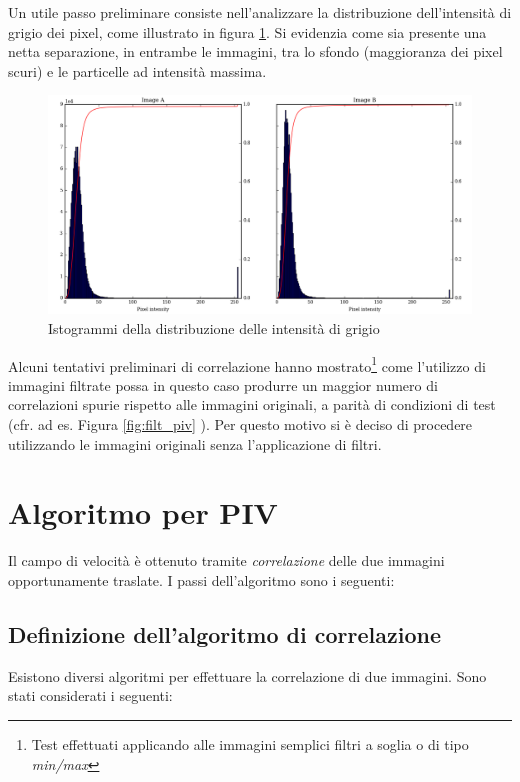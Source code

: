\documentclass[a4paper]{article}
\begin{document}
Un utile passo preliminare consiste nell'analizzare la distribuzione dell'intensità di grigio dei pixel, come illustrato in figura \ref{fig:hist}. Si evidenzia come sia presente una netta separazione, in entrambe le immagini, tra lo sfondo (maggioranza dei pixel scuri) e le particelle ad intensità massima.

\begin{figure}[h]
	\centering
	\includegraphics[width=1\textwidth]{images/hist_cr.png}
	\caption{\label{fig:hist}Istogrammi della distribuzione delle intensità di grigio}
\end{figure}

Alcuni tentativi preliminari di correlazione hanno mostrato\footnote{Test effettuati applicando alle immagini semplici filtri a soglia o di tipo \textit{min/max}\cite{mmaxf}} come l'utilizzo di immagini filtrate possa in questo caso produrre un maggior numero di correlazioni spurie rispetto alle immagini originali, a parità di condizioni di test (cfr. ad es. Figura \ref{fig:filt_piv} ).
Per questo motivo si è deciso di procedere utilizzando le immagini originali senza l'applicazione di filtri. 

\section{Algoritmo per PIV}
\label{sec:corr}

Il campo di velocità è ottenuto tramite \textit{correlazione} delle due immagini opportunamente traslate. I passi dell'algoritmo sono i seguenti:


\subsection{Definizione dell'algoritmo di correlazione}
Esistono diversi algoritmi \cite{corrCV} per effettuare la correlazione di due immagini. Sono stati considerati i seguenti:
\end{document}
